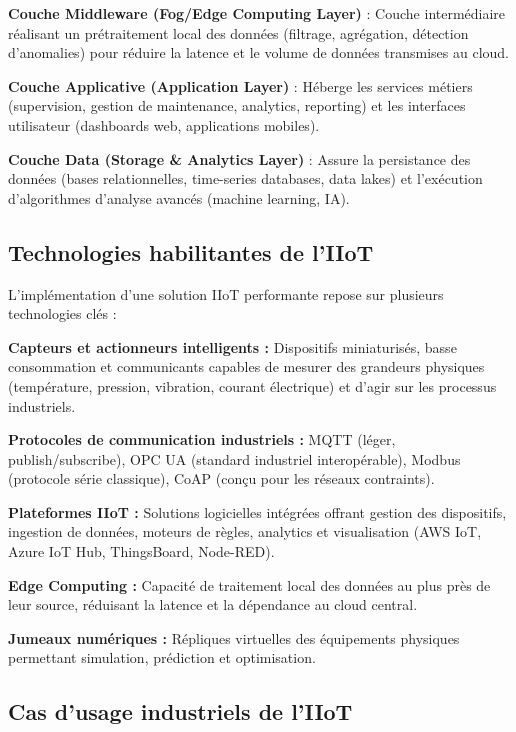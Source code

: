 \textbf{Couche Middleware (Fog/Edge Computing Layer)} : Couche intermédiaire réalisant un prétraitement local des données (filtrage, agrégation, détection d'anomalies) pour réduire la latence et le volume de données transmises au cloud.

\textbf{Couche Applicative (Application Layer)} : Héberge les services métiers (supervision, gestion de maintenance, analytics, reporting) et les interfaces utilisateur (dashboards web, applications mobiles).

\textbf{Couche Data (Storage \& Analytics Layer)} : Assure la persistance des données (bases relationnelles, time-series databases, data lakes) et l'exécution d'algorithmes d'analyse avancés (machine learning, IA).


\subsection{Technologies habilitantes de l'IIoT}

L'implémentation d'une solution IIoT performante repose sur plusieurs technologies clés :

\textbf{Capteurs et actionneurs intelligents :} Dispositifs miniaturisés, basse consommation et communicants capables de mesurer des grandeurs physiques (température, pression, vibration, courant électrique) et d'agir sur les processus industriels.

\textbf{Protocoles de communication industriels :} MQTT (léger, publish/subscribe), OPC UA (standard industriel interopérable), Modbus (protocole série classique), CoAP (conçu pour les réseaux contraints).


\textbf{Plateformes IIoT :} Solutions logicielles intégrées offrant gestion des dispositifs, ingestion de données, moteurs de règles, analytics et visualisation (AWS IoT, Azure IoT Hub, ThingsBoard, Node-RED).

\textbf{Edge Computing :} Capacité de traitement local des données au plus près de leur source, réduisant la latence et la dépendance au cloud central.

\textbf{Jumeaux numériques :} Répliques virtuelles des équipements physiques permettant simulation, prédiction et optimisation.

\subsection{Cas d'usage industriels de l'IIoT}

